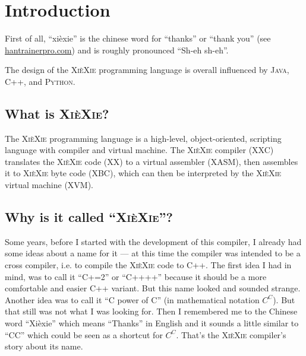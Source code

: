 \documentclass{report}
\def\xiexie{\textsc{Xi\`eXie}\xspace}
\def\xxlang{\xiexie programming language\xspace}
\def\cpp{\textsc{C++}\xspace}
\def\java{\textsc{Java}\xspace}
\def\python{\textsc{Python}\xspace}
\begin{document}

\chapter{Introduction}

First of all, ``xi\`exie'' is the chinese word for ``thanks'' or ``thank you''
(see \href{http://dictionary.hantrainerpro.com/chinese-english/translation-xiexie_thankyou.htm}{hantrainerpro.com})
and is roughly pronounced ``Sh-eh sh-eh''.

The design of the \xxlang is overall influenced by \java, \cpp, and \python.



\section{What is \xiexie?}

The \xiexie programming language is a high-level, object-oriented, scripting language with compiler and virtual machine.
The \xiexie compiler (XXC) translates the \xiexie code (XX) to a virtual assembler (XASM), then assembles it to
\xiexie byte code (XBC), which can then be interpreted by the \xiexie virtual machine (XVM).



\section{Why is it called ``\xiexie''?}

Some years, before I started with the development of this compiler, I already had some ideas about a name for it
--- at this time the compiler was intended to be a cross compiler, i.e. to compile the \xiexie code to \cpp.
The first idea I had in mind, was to call it ``C+=2'' or ``C++++'' because it should be a more comfortable and easier
\cpp variant. But this name looked and sounded strange. Another idea was to call it ``C power of C''
(in mathematical notation $C^C$). But that still was not what I was looking for.
Then I remembered me to the Chinese word ``Xi\`exie'' which means ``Thanks'' in English and it sounds a little
similar to ``CC'' which could be seen as a shortcut for $C^C$. That's the \xiexie compiler's story about its name.
\end{document}
